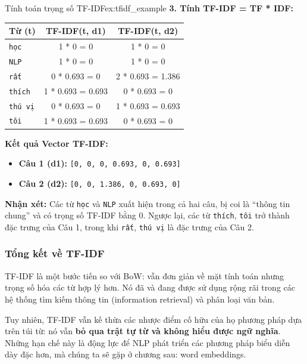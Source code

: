 \begin{example}{Tính toán trọng số TF-IDF}{ex:tfidf_example}
    \textbf{3. Tính TF-IDF = TF * IDF:}
    \begin{center}
    \begin{tabular}{|l|c|c|}
        \hline
        \textbf{Từ (t)} & \textbf{TF-IDF(t, d1)} & \textbf{TF-IDF(t, d2)} \\
        \hline
        \texttt{học} & 1 * 0 = 0 & 1 * 0 = 0 \\
        \texttt{NLP} & 1 * 0 = 0 & 1 * 0 = 0 \\
        \texttt{rất} & 0 * 0.693 = 0 & 2 * 0.693 = 1.386 \\
        \texttt{thích} & 1 * 0.693 = 0.693 & 0 * 0.693 = 0 \\
        \texttt{thú vị} & 0 * 0.693 = 0 & 1 * 0.693 = 0.693 \\
        \texttt{tôi} & 1 * 0.693 = 0.693 & 0 * 0.693 = 0 \\
        \hline
    \end{tabular}
    \end{center}

    \textbf{Kết quả Vector TF-IDF:}
    \begin{itemize}
        \item \textbf{Câu 1 (d1):} \texttt{[0, 0, 0, 0.693, 0, 0.693]}
        \item \textbf{Câu 2 (d2):} \texttt{[0, 0, 1.386, 0, 0.693, 0]}
    \end{itemize}

    \textbf{Nhận xét:} Các từ \texttt{học} và \texttt{NLP} xuất hiện trong cả hai câu, bị coi là “thông tin chung” và có trọng số TF-IDF bằng 0. Ngược lại, các từ \texttt{thích}, \texttt{tôi} trở thành đặc trưng của Câu 1, trong khi \texttt{rất}, \texttt{thú vị} là đặc trưng của Câu 2.
\end{example}

\subsubsection{Tổng kết về TF-IDF}
TF-IDF là một bước tiến so với BoW: vẫn đơn giản về mặt tính toán nhưng trọng số hóa các từ hợp lý hơn. Nó đã và đang được sử dụng rộng rãi trong các hệ thống tìm kiếm thông tin (information retrieval) và phân loại văn bản.

Tuy nhiên, TF-IDF vẫn kế thừa các nhược điểm cố hữu của họ phương pháp dựa trên túi từ: nó vẫn \textbf{bỏ qua trật tự từ và không hiểu được ngữ nghĩa}. Những hạn chế này là động lực để NLP phát triển các phương pháp biểu diễn dày đặc hơn, mà chúng ta sẽ gặp ở chương sau: word embeddings.